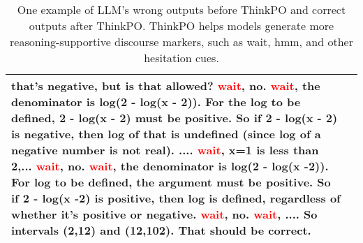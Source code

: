 \begin{table*}[ht]
{\begin{tabular}{p{0.5in}|p{5.5in}}
that's negative, but is that allowed? \textcolor{red}{wait}, no. \textcolor{red}{wait}, the denominator is log(2 - log(x - 2)). For the log to be defined, 2 - log(x - 2) must be positive. So if 2 - log(x - 2) is negative, then log of that is undefined (since log of a negative number is not real). .... \textcolor{red}{wait}, x=1 is less than 2,... \textcolor{red}{wait}, no. \textcolor{red}{wait}, the denominator is log(2 - log(x -2)). For log to be defined, the argument must be positive. So if 2 - log(x -2) is positive, then log is defined, regardless of whether it's positive or negative. \textcolor{red}{wait}, no. \textcolor{red}{wait}, .... So intervals (2,12) and (12,102). That should be correct. \\
        \bottomrule
    \end{tabular}
    }
     \caption{One example of LLM's wrong outputs before ThinkPO and correct outputs after ThinkPO. ThinkPO helps models generate more reasoning-supportive discourse markers, such as wait, hmm, and other hesitation cues. }
    \label{fig:example}
\end{table*}

